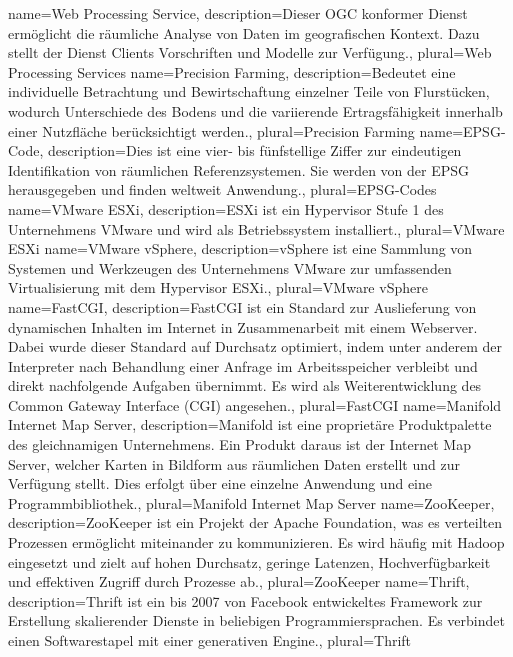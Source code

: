 {
  name=Web Processing Service,
  description={Dieser OGC konformer Dienst ermöglicht die räumliche Analyse von Daten im geografischen Kontext. Dazu stellt der Dienst Clients Vorschriften und Modelle zur Verfügung.},
  plural=Web Processing Services
}
{
  name=Precision Farming,
  description={Bedeutet eine individuelle Betrachtung und Bewirtschaftung einzelner Teile von Flurstücken, wodurch Unterschiede des Bodens und die variierende Ertragsfähigkeit innerhalb einer Nutzfläche berücksichtigt werden.},
  plural=Precision Farming
}
{
  name=EPSG-Code,
  description={Dies ist eine vier- bis fünfstellige Ziffer zur eindeutigen Identifikation von räumlichen Referenzsystemen. Sie werden von der EPSG herausgegeben und finden weltweit Anwendung.},
  plural=EPSG-Codes
}
{
  name=VMware ESXi,
  description={ESXi ist ein Hypervisor Stufe 1 des Unternehmens VMware und wird als Betriebssystem installiert.},
  plural=VMware ESXi
}
{
  name=VMware vSphere,
  description={vSphere ist eine Sammlung von Systemen und Werkzeugen des Unternehmens VMware zur umfassenden Virtualisierung mit dem Hypervisor ESXi.},
  plural=VMware vSphere
}
{
  name=FastCGI,
  description={FastCGI ist ein Standard zur Auslieferung von dynamischen Inhalten im Internet in Zusammenarbeit mit einem Webserver. Dabei wurde dieser Standard auf Durchsatz optimiert, indem unter anderem der Interpreter nach Behandlung einer Anfrage im Arbeitsspeicher verbleibt und direkt nachfolgende Aufgaben übernimmt. Es wird als Weiterentwicklung des Common Gateway Interface (CGI) angesehen.},
  plural=FastCGI
}
{
  name=Manifold Internet Map Server,
  description={Manifold ist eine proprietäre Produktpalette des gleichnamigen Unternehmens. Ein Produkt daraus ist der Internet Map Server, welcher Karten in Bildform aus räumlichen Daten erstellt und zur Verfügung stellt. Dies erfolgt über eine einzelne Anwendung und eine Programmbibliothek.},
  plural=Manifold Internet Map Server
}
{
  name=ZooKeeper,
  description={ZooKeeper ist ein Projekt der Apache Foundation, was es verteilten Prozessen ermöglicht miteinander zu kommunizieren. Es wird häufig mit Hadoop eingesetzt und zielt auf hohen Durchsatz, geringe Latenzen, Hochverfügbarkeit und effektiven Zugriff durch Prozesse ab.},
  plural=ZooKeeper
}
{
  name=Thrift,
  description={Thrift ist ein bis 2007 von Facebook entwickeltes Framework zur Erstellung skalierender Dienste in beliebigen Programmiersprachen. Es verbindet einen Softwarestapel mit einer generativen Engine.},
  plural=Thrift
}